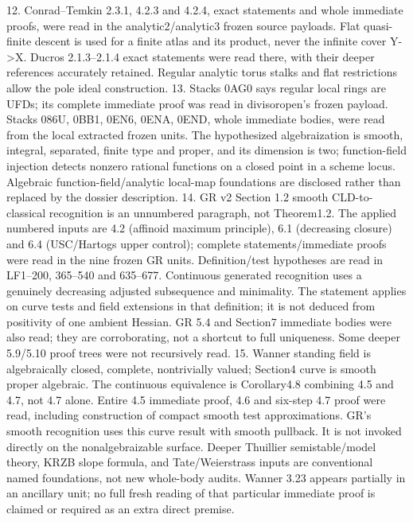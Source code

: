 \documentclass[11pt]{article}
\begin{document}
12. Conrad--Temkin 2.3.1, 4.2.3 and 4.2.4, exact statements and whole immediate proofs, were read in the analytic2/analytic3 frozen source payloads. Flat quasi-finite descent is used for a finite atlas and its product, never the infinite cover Y->X. Ducros 2.1.3--2.1.4 exact statements were read there, with their deeper references accurately retained. Regular analytic torus stalks and flat restrictions allow the pole ideal construction.
13. Stacks 0AG0 says regular local rings are UFDs; its complete immediate proof was read in divisoropen's frozen payload. Stacks 086U, 0BB1, 0EN6, 0ENA, 0END, whole immediate bodies, were read from the local extracted frozen units. The hypothesized algebraization is smooth, integral, separated, finite type and proper, and its dimension is two; function-field injection detects nonzero rational functions on a closed point in a scheme locus. Algebraic function-field/analytic local-map foundations are disclosed rather than replaced by the dossier description.
14. GR v2 Section 1.2 smooth CLD-to-classical recognition is an unnumbered paragraph, not Theorem1.2. The applied numbered inputs are 4.2 (affinoid maximum principle), 6.1 (decreasing closure) and 6.4 (USC/Hartogs upper control); complete statements/immediate proofs were read in the nine frozen GR units. Definition/test hypotheses are read in LF1--200, 365--540 and 635--677. Continuous generated recognition uses a genuinely decreasing adjusted subsequence and minimality. The statement applies on curve tests and field extensions in that definition; it is not deduced from positivity of one ambient Hessian. GR 5.4 and Section7 immediate bodies were also read; they are corroborating, not a shortcut to full uniqueness. Some deeper 5.9/5.10 proof trees were not recursively read.
15. Wanner standing field is algebraically closed, complete, nontrivially valued; Section4 curve is smooth proper algebraic. The continuous equivalence is Corollary4.8 combining 4.5 and 4.7, not 4.7 alone. Entire 4.5 immediate proof, 4.6 and six-step 4.7 proof were read, including construction of compact smooth test approximations. GR's smooth recognition uses this curve result with smooth pullback. It is not invoked directly on the nonalgebraizable surface. Deeper Thuillier semistable/model theory, KRZB slope formula, and Tate/Weierstrass inputs are conventional named foundations, not new whole-body audits. Wanner 3.23 appears partially in an ancillary unit; no full fresh reading of that particular immediate proof is claimed or required as an extra direct premise.
\end{document}
